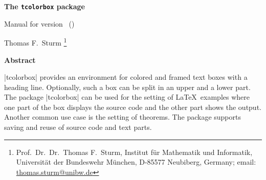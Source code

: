 \begin{center}
\vspace*{5mm}
\begin{tcolorbox}[enhanced,
  center upper,width=9cm,boxrule=0.4pt,
  colback=white,colframe=black!50!yellow,drop fuzzy midday shadow=black!50!yellow]
{\bfseries\LARGE The \texttt{tcolorbox} package\par}\medskip
{\large Manual for version \version\ (\datum)\par}
\end{tcolorbox}\bigskip
{\large Thomas F.~Sturm%
  \footnote{Prof.~Dr.~Dr.~Thomas F.~Sturm, Institut f\"{u}r Mathematik und Informatik,
    Universit\"{a}t der Bundeswehr M\"{u}nchen, D-85577 Neubiberg, Germany;
     email: \href{mailto:thomas.sturm@unibw.de}{thomas.sturm@unibw.de}} }
\end{center}
\bigskip
\begin{absquote}
  \begin{center}\bfseries Abstract\end{center}
  |tcolorbox| provides an environment for colored and framed text boxes with a
  heading line. Optionally, such a box can be split in an upper and a lower
  part. The package |tcolorbox| can be used for the setting of \LaTeX\ examples where
  one part of the box displays the source code and the other part shows the
  output. Another common use case is the setting of theorems. The package supports
  saving and reuse of source code and text parts.
\end{absquote}

\begin{tcolorbox}[breakable,enhanced,title={Contents},fonttitle=\bfseries\Large,
  colback=yellow!10!white,colframe=red!50!black,before=\par\bigskip\noindent,
  watermark color=yellow!75!red!25!white,pad at break=3mm,
  watermark text={\bfseries\Large Contents},
  drop fuzzy shadow]
\makeatletter
{}
\makeatother
\end{tcolorbox}
